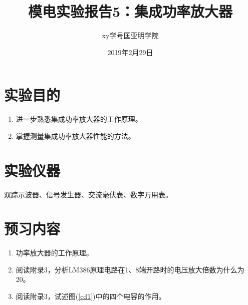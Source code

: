 \documentclass[a4paper]{article}
\title{模电实验报告5：集成功率放大器}
\author{xy\quad 学号\quad 匡亚明学院}
\date{2019年2月29日}
\begin{document}
\maketitle


\section{实验目的}
\begin{enumerate}
\item 进一步熟悉集成功率放大器的工作原理。
\item 掌握测量集成功率放大器性能的方法。
\end{enumerate}

\section{实验仪器}
双踪示波器、信号发生器、交流毫伏表、数字万用表。

\section{预习内容}
\begin{enumerate}
\item 功率放大器的工作原理。
\item 阅读附录3，分析LM386原理电路在1、8端开路时的电压放大倍数为什么为20。
\item 阅读附录3，试述图(\ref{cd1})中的四个电容的作用。
\end{enumerate}
\end{document}
